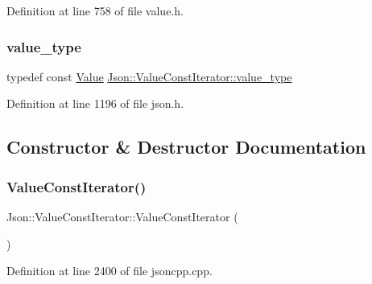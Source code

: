 Definition at line 758 of file value.\+h.

\hypertarget{class_json_1_1_value_const_iterator_aa5f1707dcef4bfe73e23ddc14dbe760d}{}\label{class_json_1_1_value_const_iterator_aa5f1707dcef4bfe73e23ddc14dbe760d} 
\subsubsection{\texorpdfstring{value\+\_\+type}{value\_type}\hspace{0.1cm}{\footnotesize\ttfamily [2/2]}}
{\footnotesize\ttfamily typedef const \hyperlink{class_json_1_1_value}{Value} \hyperlink{class_json_1_1_value_const_iterator_aa5f1707dcef4bfe73e23ddc14dbe760d}{Json\+::\+Value\+Const\+Iterator\+::value\+\_\+type}}



Definition at line 1196 of file json.\+h.



\subsection{Constructor \& Destructor Documentation}
\hypertarget{class_json_1_1_value_const_iterator_a1b10a46f1606421b0663492a5f9a2aad}{}\label{class_json_1_1_value_const_iterator_a1b10a46f1606421b0663492a5f9a2aad} 
\subsubsection{\texorpdfstring{Value\+Const\+Iterator()}{ValueConstIterator()}\hspace{0.1cm}{\footnotesize\ttfamily [1/6]}}
{\footnotesize\ttfamily Json\+::\+Value\+Const\+Iterator\+::\+Value\+Const\+Iterator (\begin{DoxyParamCaption}{ }\end{DoxyParamCaption})}



Definition at line 2400 of file jsoncpp.\+cpp.

\hypertarget{class_json_1_1_value_const_iterator_a7ef3df204a9ae83a0d8a3cd128e05c70}{}\label{class_json_1_1_value_const_iterator_a7ef3df204a9ae83a0d8a3cd128e05c70} 
